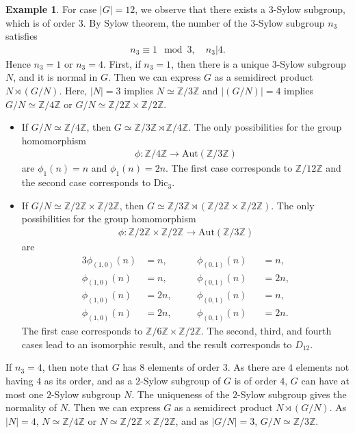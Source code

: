 \documentclass[12pt]{report}
\theoremstyle{plain}
\theoremstyle{remark}
\theoremstyle{definition}
\newtheorem{example}[theorem]{Example}
\newcommand{\Z}{\mathbb{Z}}
\begin{document}
\begin{example}
    For case $|G|=12$, we observe that there exists a $3$-Sylow subgroup, which is of order $3$. By Sylow theorem, the number of the $3$-Sylow subgroup $n_3$ satisfies
    \begin{align*}
        n_3\equiv 1\mod 3,\quad n_3|4.
    \end{align*}
    Hence $n_3=1$ or $n_3=4$. First, if $n_3=1$, then there is a unique $3$-Sylow subgroup $N$, and it is normal in $G$. Then we can express $G$ as a semidirect product $N\rtimes (G/N)$. Here, $|N|=3$ implies $N\simeq \Z/3\Z$ and $|(G/N)|=4$ implies $G/N\simeq \Z/4\Z$ or $G/N\simeq \Z/2\Z\times\Z/2\Z$.
    \begin{itemize}
        \item If $G/N\simeq \Z/4\Z$, then $G\simeq \Z/3\Z\rtimes\Z/4\Z$. The only possibilities for the group homomorphism
        \begin{align*}
            \phi:\Z/4\Z\rightarrow \mathrm{Aut}(\Z/3\Z)
        \end{align*}
        are $\phi_1(n)=n$ and $\phi_1(n)=2n$. The first case corresponds to $\Z/12\Z$ and the second case corresponds to $\mathrm{Dic}_{3}$.
        \item If $G/N\simeq \Z/2\Z\times\Z/2\Z$, then $G\simeq \Z/3\Z\rtimes(\Z/2\Z\times\Z/2\Z)$. The only possibilities for the group homomorphism
        \begin{align*}
            \phi:\Z/2\Z\times\Z/2\Z\rightarrow \mathrm{Aut}(\Z/3\Z)
        \end{align*}
        are 
        \begin{alignat*}{3}
            \phi_{(1,0)}(n)&=n,\quad &&\phi_{(0,1)}(n) &&= n, \\
            \phi_{(1,0)}(n)&=n,\quad &&\phi_{(0,1)}(n) &&= 2n, \\
            \phi_{(1,0)}(n)&=2n,\quad &&\phi_{(0,1)}(n) &&= n, \\
            \phi_{(1,0)}(n)&=2n,\quad &&\phi_{(0,1)}(n) &&= 2n.
        \end{alignat*}
        The first case corresponds to $\Z/6\Z\times\Z/2\Z$. The second, third, and fourth cases lead to an isomorphic result, and the result corresponds to $D_{12}$.
    \end{itemize}
    If $n_3=4$, then note that $G$ has $8$ elements of order $3$. As there are $4$ elements not having $4$ as its order, and as a $2$-Sylow subgroup of $G$ is of order $4$, $G$ can have at most one $2$-Sylow subgroup $N$. The uniqueness of the $2$-Sylow subgroup gives the normality of $N$. Then we can express $G$ as a semidirect product $N\rtimes (G/N)$. As $|N|=4$, $N\simeq \Z/4\Z$ or $N\simeq\Z/2\Z\times\Z/2\Z$, and as $|G/N|=3$, $G/N\simeq \Z/3\Z$.

\end{example}
\end{document}
